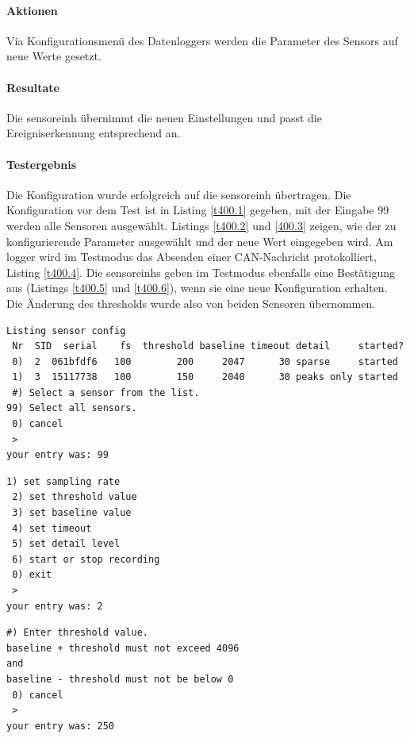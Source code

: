 \paragraph{Aktionen} Via Konfigurationsmenü des Datenloggers werden die Parameter des Sensors auf neue Werte gesetzt. 

\paragraph{Resultate} Die \gls{sensoreinh} übernimmt die neuen Einstellungen und passt die Ereigniserkennung entsprechend an.

\paragraph{Testergebnis} Die Konfiguration wurde erfolgreich auf die \gls{sensoreinh} übertragen. Die Konfiguration vor dem Test ist in Listing \ref{t400.1} gegeben, mit der Eingabe 99 werden alle Sensoren ausgewählt. Listings \ref{t400.2} und \ref{400.3} zeigen, wie der zu konfigurierende Parameter ausgewählt und der neue Wert eingegeben wird. Am \gls{logger} wird im Testmodus das Absenden einer CAN-Nachricht protokolliert, Listing \ref{t400.4}. Die \glspl{sensoreinh} geben im Testmodus ebenfalls eine Bestätigung aus (Listings \ref{t400.5} und \ref{t400.6}), wenn sie eine neue Konfiguration erhalten. Die Änderung des \gls{threshold}s wurde also von beiden Sensoren übernommen.

\begin{lstlisting}[caption=T400 Vorbedingung und Auswahl aller Sensoren, label=t400.1]
Listing sensor config
 Nr  SID  serial    fs  threshold baseline timeout detail     started?
 0)  2  061bfdf6   100        200     2047      30 sparse     started
 1)  3  15117738   100        150     2040      30 peaks only started
 #) Select a sensor from the list.
99) Select all sensors.
 0) cancel
 >
your entry was: 99
\end{lstlisting}

\begin{lstlisting}[caption=T400 Auswahl des Parameters, label=t400.2]
 1) set sampling rate
 2) set threshold value
 3) set baseline value
 4) set timeout
 5) set detail level
 6) start or stop recording
 0) exit
 >
your entry was: 2
\end{lstlisting}

\begin{lstlisting}[caption=T400 Eingabe des neuen \gls{threshold}s, label=t400.3]
 #) Enter threshold value.
baseline + threshold must not exceed 4096
and
baseline - threshold must not be below 0
 0) cancel
 >
your entry was: 250
\end{lstlisting}

